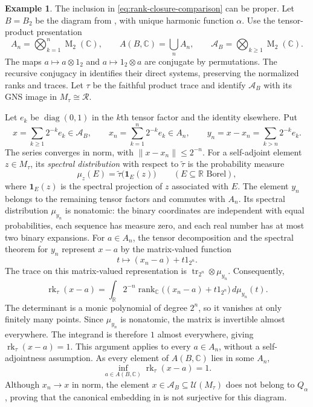 \documentclass[11pt]{amsart}
\DeclareMathOperator{\rk}{rk}
\DeclareMathOperator{\Mat}{M}
\DeclareMathOperator{\diag}{diag}
\theoremstyle{definition}
\newtheorem{example}[theorem]{Example}
\theoremstyle{remark}
\begin{document}
\begin{example}
\label{ex:proper-core-rank-closure}
The inclusion in \eqref{eq:rank-closure-comparison} can be proper.
Let $B=B_2$ be the diagram from ,
with unique harmonic function $\alpha$.  Use the tensor-product presentation
\[
 A_n=\bigotimes_{k=1}^n\Mat_2(\mathbb C),\qquad
 A(B,\mathbb C)=\bigcup_n A_n,\qquad
 \mathcal A_B=\bigotimes_{k\geq1}\Mat_2(\mathbb C).
\]
The maps $a\mapsto a\otimes1_2$ and $a\mapsto1_2\otimes a$ are
conjugate by permutations.
The recursive conjugacy in
 identifies their direct systems,
preserving the normalized ranks and traces.
Let $\tau$ be the faithful product trace and identify $\mathcal A_B$
with its GNS image in $M_\tau\cong\mathcal R$.

Let $e_k$ be $\diag(0,1)$ in the $k$th tensor factor and the identity
elsewhere.  Put
\[
 x=\sum_{k\geq1}2^{-k}e_k\in\mathcal A_B,\qquad
 x_n=\sum_{k=1}^n2^{-k}e_k\in A_n,\qquad
 y_n=x-x_n=\sum_{k>n}2^{-k}e_k.
\]
The series converges in norm, with $\|x-x_n\|\leq2^{-n}$.
For a self-adjoint element $z\in M_\tau$, its \emph{spectral
 distribution} with respect to $\widetilde\tau$ is the probability
measure
\[
 \mu_z(E)=\widetilde\tau\bigl(\mathbf 1_E(z)\bigr)
 \qquad(E\subseteq\mathbb R\text{ Borel}),
\]
where $\mathbf 1_E(z)$ is the spectral projection of $z$ associated
with $E$.
The element $y_n$ belongs to the remaining tensor factors and commutes
with $A_n$.  Its spectral distribution $\mu_{y_n}$ is nonatomic:
the binary coordinates are independent with equal probabilities,
each sequence has measure zero, and each real number has at most
two binary expansions.
For $a\in A_n$, the tensor decomposition and the spectral theorem for
$y_n$ represent $x-a$ by the matrix-valued function
\[
 t\longmapsto(x_n-a)+t1_{2^n}.
\]
The trace on this matrix-valued representation is
$\operatorname{tr}_{2^n}\otimes\mu_{y_n}$.  Consequently,
\[
 \rk_\tau(x-a)=\int_{\mathbb R}
 2^{-n}\operatorname{rank}_{\mathbb C}
 \bigl((x_n-a)+t1_{2^n}\bigr)\,d\mu_{y_n}(t).
\]
The determinant is a monic polynomial of degree $2^n$, so it vanishes
at only finitely many points.  Since $\mu_{y_n}$ is nonatomic,
the matrix is invertible almost everywhere.  The integrand is
therefore $1$ almost everywhere, giving $\rk_\tau(x-a)=1$.
This argument applies to every $a\in A_n$, without a self-adjointness
assumption.
As every element of $A(B,\mathbb C)$ lies in some $A_n$,
\begin{equation}\label{eq:proper-core-distance}
 \inf_{a\in A(B,\mathbb C)}\rk_\tau(x-a)=1.
\end{equation}
Although $x_n\to x$ in norm, the element
$x\in\mathcal A_B\subseteq\mathcal U(M_\tau)$ does not belong
to $Q_\alpha$, proving that the canonical embedding in
 is not surjective for this diagram.


\end{example}
\end{document}

